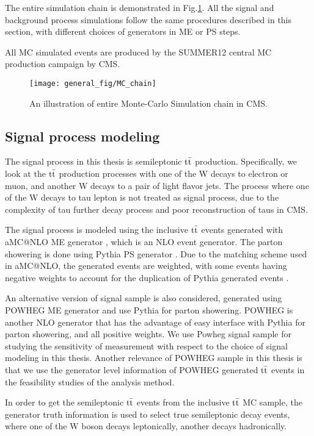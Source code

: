 The entire simulation chain is demonstrated in Fig.\ref{fig:mcchain}. All the signal and background process simulations follow the same procedures described in this section, with different choices of generators in ME or PS steps.

All MC simulated events are produced by the SUMMER12 central MC production campaign by CMS.

\begin{figure}
	\centering
	\texttt{[image: general\_fig/MC\_chain]}
	\caption[MC chain in CMS]
	{An illustration of entire Monte-Carlo Simulation chain in CMS. \cite{Goerner:1754332}}
	\label{fig:mcchain}
\end{figure}


\subsection{Signal process modeling}
The signal process in this thesis is semileptonic $\mathrm{t}\bar{\mathrm{t}}$ production. Specifically, we look at the $\mathrm{t}\bar{\mathrm{t}}$ production processes with one of the W decays to electron or muon, and another W decays to a pair of light flavor jets. The process where one of the W decays to tau lepton is not treated as signal process, due to the complexity of tau further decay process and poor reconstruction of taus in CMS.

The signal process is modeled using the inclusive $\mathrm{t}\bar{\mathrm{t}}$ events generated with aMC@NLO ME generator \cite{aMC@NLO}, which is an NLO event generator. The parton showering is done using Pythia PS generator \cite{Pythia}. Due to the matching scheme used in aMC@NLO, the generated events are weighted, with some events having negative weights to account for the duplication of Pythia generated events \cite{MC@NLOmatching}. 

An alternative version of signal sample is also considered, generated using POWHEG ME generator and use Pythia for parton showering. POWHEG is another NLO generator \cite{powheg} that has the advantage of easy interface with Pythia for parton showering, and all positive weights. We use Powheg signal sample for studying the sensitivity of measurement with respect to the choice of signal modeling in this thesis. Another relevance of POWHEG sample in this thesis is that we use the generator level information of POWHEG generated $\mathrm{t}\bar{\mathrm{t}}$ events in the feasibility studies of the analysis method. 

In order to get the semileptonic $\mathrm{t}\bar{\mathrm{t}}$ events from the inclusive $\mathrm{t}\bar{\mathrm{t}}$ MC sample, the generator truth information is used to select true semileptonic decay events, where one of the W boson decays leptonically, another decays hadronically.  

